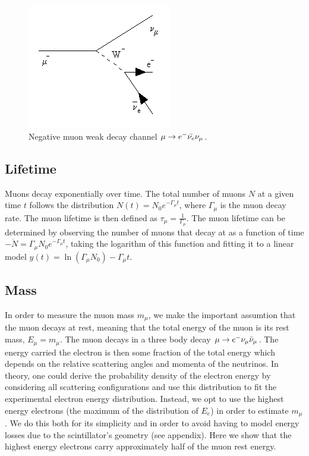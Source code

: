 \documentclass[aps,prb,twocolumn,superscriptaddress,floatfix,longbibliography,citeautoscript]{revtex4-2}
\begin{document}
 
\begin{figure}
    \centering
    \includegraphics[width=0.5\linewidth]{mudecay.png}
    \caption{Negative muon weak decay channel $\mu \to e^-\Bar{\nu_e}\nu_\mu$.}
    \label{fig:mu_decay}
\end{figure}
 
\subsection{\label{sec:lifetime}Lifetime}
Muons decay exponentially over time. The total number of muons $N$ at a given time $t$ follows the distribution $N(t) = N_0e^{-\Gamma_\mu t}$, where $\Gamma_\mu$ is the muon decay rate. The muon lifetime is then defined as $\tau_\mu = \frac{1}{\Gamma_\mu}$. The muon lifetime can be determined by observing the number of muons that decay at as a function of time $-\dot{N} =\Gamma_\mu N_0e^{-\Gamma_\mu t}$, taking the logarithm of this function and fitting it to a linear model $y(t) = \ln(\Gamma_\mu N_0) - \Gamma_\mu t$.

\subsection{\label{sec:mass}Mass}
In order to measure the muon mass $m_\mu$, we make the important assumtion that the muon decays at rest, meaning that the total energy of the muon is its rest mass, $E_\mu = m_\mu$. The muon decays in a three body decay $\mu \to e^- \nu_\mu \Bar{\nu}_\mu$. The energy carried the electron is then some fraction of the total energy which depends on the relative scattering angles and momenta of the neutrinos. In theory, one could derive the probability density of the electron energy by considering all scattering configurations and use this distribution to fit the experimental electron energy distribution. Instead, we opt to use the highest energy electrons (the maximum of the distribution of $E_e$) in order to estimate $m_\mu$. We do this both for its simplicity and in order to avoid having to model energy losses due to the scintillator's geometry (see appendix). Here we show that the highest energy electrons carry approximately half of the muon rest energy.  
\end{document}
